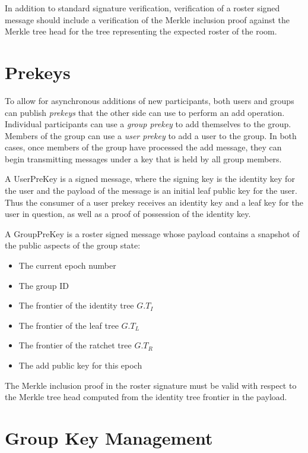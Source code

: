 \documentclass[11pt, oneside]{article}
\begin{document}
In addition to standard signature verification, verification of a roster signed message should include a verification of the Merkle inclusion proof against the Merkle tree head for the tree representing the expected roster of the room.


\section{Prekeys}

To allow for asynchronous additions of new participants, both users and groups can publish \emph{prekeys} that the other side can use to perform an add operation.  Individual participants can use a \emph{group prekey} to add themselves to the group.  Members of the group can use a \emph{user prekey} to add a user to the group.  In both cases, once members of the group have processed the add message, they can begin transmitting messages under a key that is held by all group members.

A UserPreKey is a signed message, where the signing key is the identity key for the user and the payload of the message is an initial leaf public key for the user.  Thus the consumer of a user prekey receives an identity key and a leaf key for the user in question, as well as a proof of possession of the identity key.

A GroupPreKey is a roster signed message whose payload contains a snapshot of the public aspects of the group state:

\begin{itemize}
\item{The current epoch number}
\item{The group ID}
\item{The frontier of the identity tree $G.T_I$}
\item{The frontier of the leaf tree $G.T_L$}
\item{The frontier of the ratchet tree $G.T_R$}
\item{The add public key for this epoch}
\end{itemize}

The Merkle inclusion proof in the roster signature must be valid with respect to the Merkle tree head computed from the identity tree frontier in the payload.


\section{Group Key Management}
\end{document}
